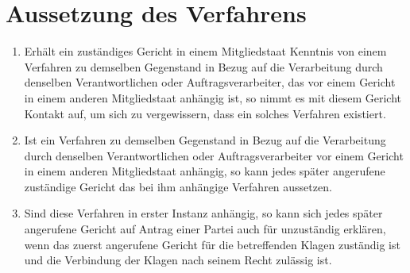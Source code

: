 \chapter{Aussetzung des Verfahrens}
\label{ch:81}


\begin{enumerate}

  \item Erhält ein zuständiges Gericht in einem Mitgliedstaat Kenntnis von einem Verfahren zu demselben Gegenstand in
   Bezug auf die Verarbeitung durch denselben Verantwortlichen oder Auftragsverarbeiter, das vor einem Gericht in einem
   anderen Mitgliedstaat anhängig ist, so nimmt es mit diesem Gericht Kontakt auf, um sich zu vergewissern, dass ein
   solches Verfahren existiert.
  \label{itm:81-1}

  \item Ist ein Verfahren zu demselben Gegenstand in Bezug auf die Verarbeitung durch denselben Verantwortlichen oder
   Auftragsverarbeiter vor einem Gericht in einem anderen Mitgliedstaat anhängig, so kann jedes später angerufene
   zuständige Gericht das bei ihm anhängige Verfahren aussetzen.
  \label{itm:81-2}

  \item Sind diese Verfahren in erster Instanz anhängig, so kann sich jedes später angerufene Gericht auf Antrag einer
   Partei auch für unzuständig erklären, wenn das zuerst angerufene Gericht für die betreffenden Klagen zuständig ist
   und die Verbindung der Klagen nach seinem Recht zulässig ist.
  \label{itm:81-3}

\end{enumerate}


